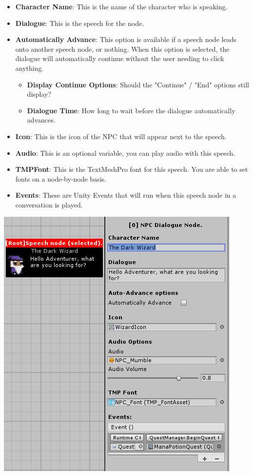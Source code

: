 \documentclass[a4paper,12pt]{article}
\begin{document}
\begin{minipage}[c]{0.45\textwidth}
\begin{itemize}
\setlength\itemsep{1pt}
	\item \textbf{Character Name}: This is the name of the character who is speaking.
	\item \textbf{Dialogue}: This is the speech for the node.
	\item \textbf{Automatically Advance}: This option is available if a speech node leads onto another speech node, or nothing. When this option is selected, the dialogue will automatically continue without the user needing to click anything.
	\begin{itemize}
		\item \textbf{Display Continue Options}: Should the "Continue" / "End" options still display?
		\item \textbf{Dialogue Time}: How long to wait before the dialogue automatically advances.
	\end{itemize}
	\item \textbf{Icon}: This is the icon of the NPC that will appear next to the speech.
	\item \textbf{Audio}: This is an optional variable, you can play audio with this speech.
	\item \textbf{TMPFont}: This is the TextMeshPro font for this speech. You are able to set fonts on a node-by-node basis.
	\item \textbf{Events}: These are Unity Events that will run when this speech node in a conversation is played.
\end{itemize}
\end{minipage}
\hfill
\begin{minipage}[c]{0.45\textwidth}
\centering
\includegraphics[width=\linewidth]{img/SpeechNode.png}
\end{minipage}
\end{document}
